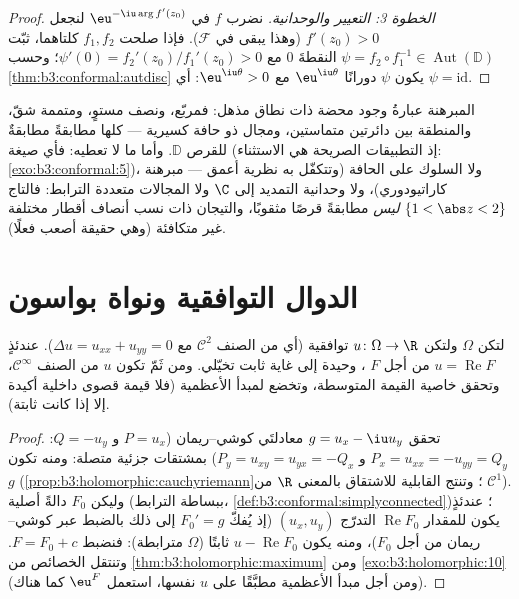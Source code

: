 \begin{proof}
\emph{الخطوة 3: التعيير والوحدانية.} نضرب $f$ في $\eu^{-\iu\arg f'(z_0)}$ لنجعل
$f'(z_0) > 0$ (وهذا يبقى في $\mathcal F$). فإذا صلحت $f_1, f_2$
كلتاهما، ثبّت $\psi =
f_2\circ f_1^{-1} \in \operatorname{Aut}(\mathbb D)$ النقطةَ $0$ مع $\psi'(0) = f_2'(z_0)/f_1'(z_0) > 0$؛ وحسب \cref{thm:b3:conformal:autdisc}
يكون $\psi$ دورانًا $\eu^{\iu\theta}$ مع $\eu^{\iu\theta} > 0$: أي $\psi =
\mathrm{id}$.
\end{proof}

\begin{remark}\label{rem:b3:conformal:rmtscope}
المبرهنة عبارةُ وجود محضة ذات نطاق مذهل: فمربّع، ونصف مستوٍ،
ومتممة شقّ، والمنطقة بين دائرتين متماستين، ومجال ذو حافة
كسيرية --- كلها مطابقةً مطابقةٌ للقرص $\mathbb D$. وأما ما لا
تعطيه: فأي صيغة (إذ التطبيقات الصريحة هي الاستثناء:
\cref{exo:b3:conformal:5})، ولا السلوك على الحافة (وتتكفّل به نظرية أعمق ---
مبرهنة كاراتيودوري)، ولا وحدانية التمديد إلى $\C$ ولا المجالات
متعددة الترابط: فالتاج $\{1 < \abs z < 2\}$ \emph{ليس} مطابقةً قرصًا
مثقوبًا، والتيجان ذات نسب أنصاف أقطار مختلفة غير متكافئة (وهي
حقيقة أصعب فعلًا).
\end{remark}

\section{الدوال التوافقية ونواة بواسون}

\begin{proposition}\label{prop:b3:conformal:harmonicholo}
لتكن $\Omega$  ولتكن $u \colon \Omega \to \R$
توافقية (أي من الصنف $\mathcal C^2$ مع
$\Delta u = u_{xx} + u_{yy} = 0$). عندئذٍ $u =
\operatorname{Re}F$ من أجل $F$ ، وحيدة إلى غاية
ثابت تخيّلي. ومن ثَمّ تكون $u$ من الصنف $\mathcal C^\infty$، وتحقق خاصية
القيمة المتوسطة، وتخضع لمبدأ الأعظمية (فلا قيمة قصوى داخلية
أكيدة إلا إذا كانت ثابتة).
\end{proposition}

\begin{proof}
تحقق $g = u_x - \iu u_y$ معادلتَي كوشي--ريمان ($P = u_x$ و $Q = -u_y$:
$P_x = u_{xx} = -u_{yy} = Q_y$ و $P_y = u_{xy} = u_{yx} = -Q_x$) بمشتقات جزئية متصلة: ومنه تكون $g$
 (\cref{prop:b3:holomorphic:cauchyriemann}؛ وتنتج القابلية للاشتقاق بالمعنى $\R$
من $\mathcal C^1$). وليكن $F_0$ دالةً أصلية (ببساطة الترابط،
\cref{def:b3:conformal:simplyconnected})؛ عندئذٍ يكون للمقدار $\operatorname{Re}F_0$ التدرّج $(u_x, u_y)$
(إذ يُفكّ $F_0' = g$ إلى ذلك بالضبط عبر كوشي--ريمان من أجل
$F_0$)، ومنه يكون $u - \operatorname{Re}F_0$ ثابتًا ($\Omega$ مترابطة): فنضبط
$F = F_0 + c$. وتنتقل الخصائص من \cref{thm:b3:holomorphic:maximum} ومن \cref{exo:b3:holomorphic:10}
(ومن أجل مبدأ الأعظمية مطبَّقًا على $u$ نفسها، استعمل $\eu^{F}$
كما هناك).
\end{proof}

